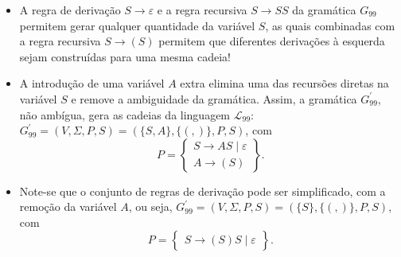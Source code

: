 \documentclass[12pt]{article}
\def\myling{{99}} %
\begin{document}
\begin{tcolorbox}[breakable,rounded corners, colback=yellow!5, colframe=red!40!black, title={$G^\prime_{\myling}$ não ambígua.}]
 \begin{itemize}
  \item A regra de derivação $S\to \varepsilon$ e a regra recursiva $S\to SS$ da gramática $G_{\myling}$ permitem gerar qualquer quantidade da variável $S$, as quais combinadas com a regra recursiva $S\to (S)$ permitem que diferentes derivações à esquerda sejam construídas para uma mesma cadeia!
  \item A introdução de uma variável $A$ extra elimina uma das recursões diretas na variável $S$ e remove a ambiguidade da gramática. Assim, a gramática $G^\prime_{\myling}$, não ambígua, gera as cadeias da linguagem $\mathcal{L}_{\myling}$:  $G^\prime_{\myling}=(V,\Sigma,P,S)=(\{S,A\},\{(,)\},P,S)$, com
    $$
     P =
     \left\{\begin{array}{l}
      S \to AS \mid \varepsilon\\
      A \to (S)
     \end{array}\right\}.
    $$
  \item Note-se que o conjunto de regras de derivação pode ser simplificado, com a remoção da variável $A$, ou seja, $G^\prime_{\myling}=(V,\Sigma,P,S)=(\{S\},\{(,)\},P,S)$, com
  $$
   P =
   \left\{\begin{array}{l}
    S \to (S)S \mid \varepsilon
   \end{array}\right\}.
  $$
 \end{itemize}
\end{tcolorbox}
\end{document}
